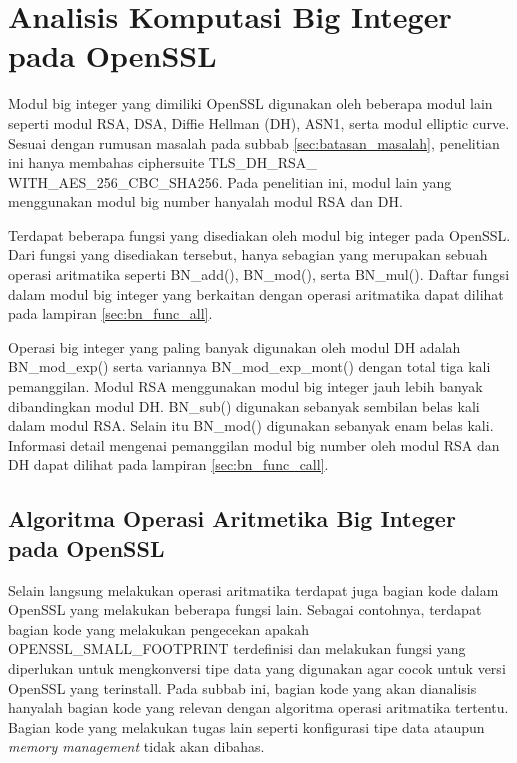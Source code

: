 \section{Analisis Komputasi Big Integer pada OpenSSL}



Modul big integer yang dimiliki OpenSSL digunakan oleh beberapa modul lain seperti modul RSA, DSA, Diffie Hellman (DH), ASN1, serta modul elliptic curve. Sesuai dengan rumusan masalah pada subbab \ref{sec:batasan_masalah}, penelitian ini hanya membahas ciphersuite TLS\_DH\_RSA\_ WITH\_AES\_256\_CBC\_SHA256. Pada penelitian ini, modul lain yang menggunakan modul big number hanyalah modul RSA dan DH.

Terdapat beberapa fungsi yang disediakan oleh modul big integer pada OpenSSL. Dari fungsi yang disediakan tersebut, hanya sebagian yang merupakan sebuah operasi aritmatika seperti BN\_add(), BN\_mod(), serta BN\_mul(). Daftar fungsi dalam modul big integer yang berkaitan dengan operasi aritmatika dapat dilihat pada lampiran \ref{sec:bn_func_all}.

Operasi big integer yang paling banyak digunakan oleh modul DH adalah BN\_mod\_exp() serta variannya BN\_mod\_exp\_mont() dengan total tiga kali pemanggilan. Modul RSA menggunakan modul big integer jauh lebih banyak dibandingkan modul DH. BN\_sub() digunakan sebanyak sembilan belas kali dalam modul RSA. Selain itu BN\_mod() digunakan sebanyak enam belas kali. Informasi detail mengenai pemanggilan modul big number oleh modul RSA dan DH dapat dilihat pada lampiran \ref{sec:bn_func_call}.

\subsection{Algoritma Operasi Aritmetika Big Integer pada OpenSSL}

Selain langsung melakukan operasi aritmatika terdapat juga bagian kode dalam OpenSSL yang melakukan beberapa fungsi lain. Sebagai contohnya, terdapat bagian kode yang melakukan pengecekan apakah OPENSSL\_SMALL\_FOOTPRINT terdefinisi dan melakukan fungsi yang diperlukan untuk mengkonversi tipe data yang digunakan agar cocok untuk versi OpenSSL yang terinstall. Pada subbab ini, bagian kode yang akan dianalisis hanyalah bagian kode yang relevan dengan algoritma operasi aritmatika tertentu. Bagian kode yang melakukan tugas lain seperti konfigurasi tipe data ataupun \textit{memory management} tidak akan dibahas.

